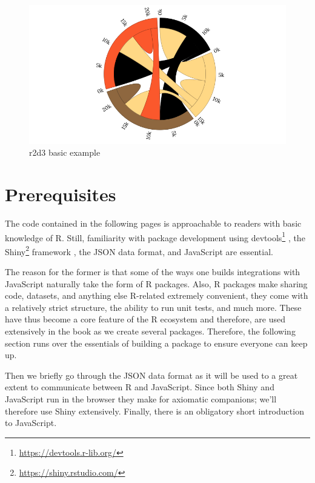 \documentclass[
  10pt,
]{krantz}
\renewcommand{\href}[2]{#2\footnote{\url{#1}}}
\begin{document}
\begin{figure}[H]

{\centering \includegraphics[width=1\linewidth]{images/01-d3} 

}

\caption{r2d3 basic example}\label{fig:r2d3}
\end{figure}

\hypertarget{prerequisites}{%
\chapter{Prerequisites}\label{prerequisites}}

The code contained in the following pages is approachable to readers with basic knowledge of R. Still, familiarity with package development using \href{https://devtools.r-lib.org/}{devtools} \citep{R-devtools}, the \href{https://shiny.rstudio.com/}{Shiny} framework \citep{R-shiny}, the JSON data format, and JavaScript are essential.

The reason for the former is that some of the ways one builds integrations with JavaScript naturally take the form of R packages. Also, R packages make sharing code, datasets, and anything else R-related extremely convenient, they come with a relatively strict structure, the ability to run unit tests, and much more. These have thus become a core feature of the R ecosystem and therefore, are used extensively in the book as we create several packages. Therefore, the following section runs over the essentials of building a package to ensure everyone can keep up.

Then we briefly go through the JSON data format as it will be used to a great extent to communicate between R and JavaScript. Since both Shiny and JavaScript run in the browser they make for axiomatic companions; we'll therefore use Shiny extensively. Finally, there is an obligatory short introduction to JavaScript.
\end{document}
